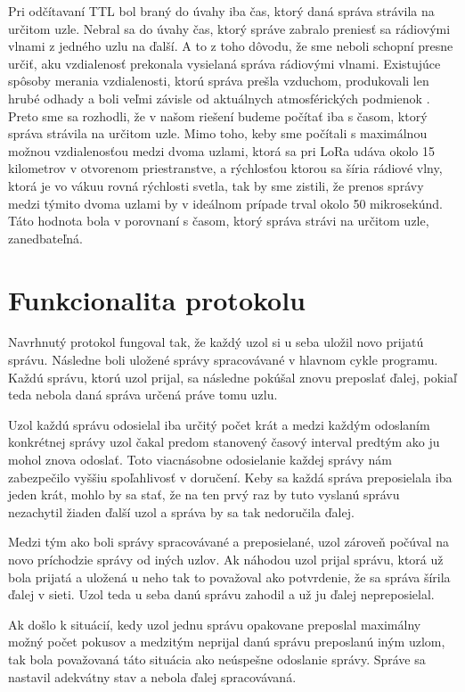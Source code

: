 \documentclass[slovak,master]{diploma}
\begin{document}
Pri odčítavaní TTL bol braný do úvahy iba čas, ktorý daná správa strávila na určitom uzle. Nebral sa do úvahy čas, ktorý správe zabralo preniesť sa rádiovými vlnami z jedného uzlu 
na ďalší. A to z toho dôvodu, že sme neboli schopní presne určiť, aku vzdialenosť prekonala vysielaná správa rádiovými vlnami. Existujúce spôsoby merania vzdialenosti, 
ktorú správa prešla vzduchom, produkovali len hrubé odhady a boli veľmi závisle od aktuálnych atmosférických podmienok \cite{Simka2021thesis}. Preto sme sa rozhodli, že v našom riešení budeme 
počítať iba s časom, ktorý správa strávila na určitom uzle. Mimo toho, keby sme počítali s maximálnou možnou vzdialenosťou medzi dvoma uzlami, ktorá sa pri LoRa 
udáva okolo 15 kilometrov v otvorenom priestranstve, a rýchlosťou ktorou sa šíria rádiové vlny, ktorá je vo vákuu rovná rýchlosti svetla, tak by sme zistili, 
že prenos správy medzi týmito dvoma uzlami by v ideálnom prípade trval okolo 50 mikrosekúnd. Táto hodnota bola v porovnaní s časom, ktorý správa strávi na určitom uzle, 
zanedbateľná.

\section{Funkcionalita protokolu}
Navrhnutý protokol fungoval tak, že každý uzol si u seba uložil novo prijatú správu. Následne boli uložené správy spracovávané v hlavnom cykle programu. 
Každú správu, ktorú uzol prijal, sa následne pokúšal znovu preposlať ďalej, pokiaľ teda nebola daná správa určená práve tomu uzlu.

Uzol každú správu odosielal iba určitý počet krát a medzi každým odoslaním konkrétnej správy uzol čakal predom stanovený časový interval predtým ako ju mohol znova odoslať.
Toto viacnásobne odosielanie každej správy nám zabezpečilo vyššiu spoľahlivosť v doručení. Keby sa každá správa preposielala iba jeden krát, mohlo by sa stať, že na ten prvý raz 
by tuto vyslanú správu nezachytil žiaden ďalší uzol a správa by sa tak nedoručila ďalej.

Medzi tým ako boli správy spracovávané a preposielané, uzol zároveň počúval na novo príchodzie správy od iných uzlov. Ak náhodou uzol 
prijal správu, ktorá už bola prijatá a uložená u neho tak to považoval ako potvrdenie, že sa správa šírila ďalej v sieti. Uzol teda u seba danú správu zahodil a už ju 
ďalej nepreposielal.

Ak došlo k situácií, kedy uzol jednu správu opakovane preposlal maximálny možný počet pokusov a medzitým neprijal danú správu preposlanú iným uzlom, 
tak bola považovaná táto situácia ako neúspešne odoslanie správy. Správe sa nastavil adekvátny stav a nebola ďalej spracovávaná.
\end{document}
